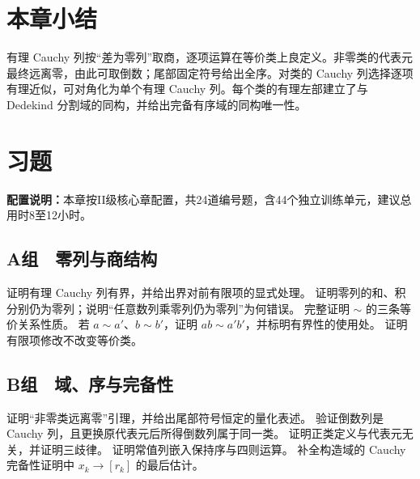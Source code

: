 \section*{本章小结}

有理 Cauchy 列按“差为零列”取商，逐项运算在等价类上良定义。非零类的代表元最终远离零，由此可取倒数；尾部固定符号给出全序。对类的 Cauchy 列选择逐项有理近似，可对角化为单个有理 Cauchy 列。每个类的有理左部建立了与 Dedekind 分割域的同构，并给出完备有序域的同构唯一性。

\section*{习题}

\noindent\textbf{配置说明：}本章按II级核心章配置，共24道编号题，含44个独立训练单元，建议总用时8至12小时。

\subsection*{A组　零列与商结构}
\begin{enumerate}[label=\textbf{5.\arabic*.}]
  \mustdo 证明有理 Cauchy 列有界，并给出界对前有限项的显式处理。
  \mustdo 证明零列的和、积分别仍为零列；说明“任意数列乘零列仍为零列”为何错误。
  \mustdo 完整证明 \(\sim\) 的三条等价关系性质。
  \mustdo 若 \(a\sim a'\)、\(b\sim b'\)，证明 \(ab\sim a'b'\)，并标明有界性的使用处。
  \mustdo 证明有限项修改不改变等价类。
\end{enumerate}

\subsection*{B组　域、序与完备性}
\begin{enumerate}[label=\textbf{5.\arabic*.},resume]
  \mustdo 证明“非零类远离零”引理，并给出尾部符号恒定的量化表述。
  \mustdo 验证倒数列是 Cauchy 列，且更换原代表元后所得倒数列属于同一类。
  \mustdo 证明正类定义与代表元无关，并证明三歧律。
  \mustdo 证明常值列嵌入保持序与四则运算。
  \mustdo 补全构造域的 Cauchy 完备性证明中 \(x_k\to[r_k]\) 的最后估计。
\end{enumerate}

